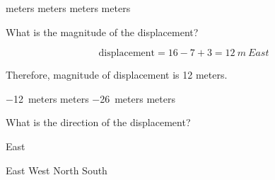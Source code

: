 \documentclass[addpoints]{exam}
\begin{document}
\begin{questions}
\begin{choices}
 meters
 meters
 meters
 meters
\end{choices}

\question
What is the magnitude of the displacement?

\begin{solution}
\begin{equation*}
  \mathrm{displacement} = 16 - 7 + 3 = \SI{12}{m \ East}  
\end{equation*}

Therefore, magnitude of displacement is 12 meters.
\end{solution}

\begin{choices}
\choice \SI{-12}{meters}
 meters
\choice \SI{-26}{meters}
 meters
\end{choices}

\question \label{ques:cat_end}
What is the direction of the displacement?

\begin{solution}
East
\end{solution}

\begin{choices}
\CorrectChoice East
\choice West
\choice North
\choice South
\end{choices}







\end{questions}
\end{document}
